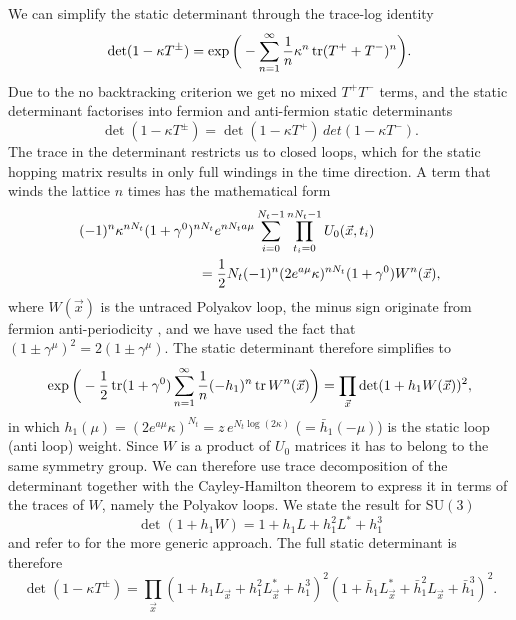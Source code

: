 We can simplify the static determinant through the trace-log identity
%
\begin{equation}
  \det (1 - \kappa T^{\pm}) = \exp \bigg(- \sum_{n=1}^{\infty} \frac{1}{n}
  \kappa^n \operatorname{tr} (T^+ + T^-)^n \bigg).
\end{equation}
%
Due to the no backtracking criterion we get no mixed $T^+ T^-$ terms, and the
static determinant factorises into fermion and anti-fermion static determinants
%
\begin{equation}
  \det (1 - \kappa T^{\pm}) = \det (1 - \kappa T^+)\, det (1 - \kappa T^-) .
\end{equation}
%
The trace in the determinant restricts us to closed loops, which for the static
hopping matrix results in only full windings in the time direction. A term that
winds the lattice $n$ times has the mathematical form
%
\begin{align}
  &(-1)^n \kappa^{n N_t} (1+\gamma^0)^{n N_t} e^{n N_t a \mu}
    \sum_{i=0}^{N_t-1} \prod_{t_i=0}^{n N_t-1} U_0(\vec{x},t_i) \nonumber\\
  &\hskip3cm= \frac{1}{2} N_t (-1)^n (2 e^{a\mu} \kappa)^{n N_t} (1+\gamma^0) W^n(\vec{x}),
\end{align}
%
where $W(\vec{x})$ is the untraced Polyakov loop, the minus sign originate from
fermion anti-periodicity , and we have used the fact that $(1\pm\gamma^{\mu})^2
= 2 (1\pm\gamma^{\mu})$. The static determinant therefore simplifies to
%
\begin{equation}
  \exp\bigg(-\frac{1}{2} \operatorname{tr}(1+\gamma^0) \sum_{n=1}^{\infty} \frac{1}{n} (-h_1)^{n}
  \operatorname{tr} W^n (\vec{x}) \bigg) = \prod_{\vec{x}} \det(1 + h_1 W(\vec{x}))^2,
\end{equation}
%
in which $h_1(\mu) = (2e^{a\mu}\kappa)^{N_t} = z\, e^{N_t \log(2\kappa)}$
($=\bar{h}_1(-\mu)$) is the static loop (anti loop) weight. Since $W$ is
a product of $U_0$ matrices it has to belong to the same symmetry group. We can
therefore use trace decomposition of the determinant together with the
Cayley-Hamilton theorem to express it in terms of the traces of $W$, namely the
Polyakov loops. We state the result for SU$(3)$
%
\begin{equation}
  \det(1 + h_1 W) = 1 + h_1 L + h_1^2 L^* + h_1^3
\end{equation}
%
and refer to  for the more generic approach. The
full static determinant is therefore
%
\begin{equation}
  \det(1 - \kappa T^{\pm}) = \prod_{\vec{x}} (1 + h_1 L_{\vec{x}} + h_1^2 L^*_{\vec{x}} + h_1^3)^2
    (1 + \bar{h}_1 L^*_{\vec{x}} +  \bar{h}_1^2 L_{\vec{x}} + \bar{h}_1^3)^2.
\end{equation}


